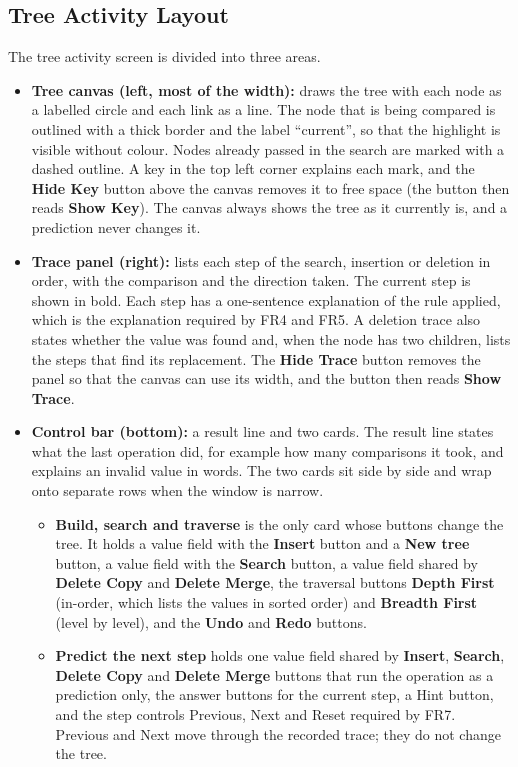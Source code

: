 \subsection{Tree Activity Layout}
The tree activity screen is divided into three areas.

\begin{itemize}
    \item \textbf{Tree canvas (left, most of the width):} draws the tree with each node as a labelled circle and each link as a line. The node that is being compared is outlined with a thick border and the label ``current'', so that the highlight is visible without colour. Nodes already passed in the search are marked with a dashed outline. A key in the top left corner explains each mark, and the \textbf{Hide Key} button above the canvas removes it to free space (the button then reads \textbf{Show Key}). The canvas always shows the tree as it currently is, and a prediction never changes it.
    \item \textbf{Trace panel (right):} lists each step of the search, insertion or deletion in order, with the comparison and the direction taken. The current step is shown in bold. Each step has a one-sentence explanation of the rule applied, which is the explanation required by FR4 and FR5. A deletion trace also states whether the value was found and, when the node has two children, lists the steps that find its replacement. The \textbf{Hide Trace} button removes the panel so that the canvas can use its width, and the button then reads \textbf{Show Trace}.
    \item \textbf{Control bar (bottom):} a result line and two cards. The result line states what the last operation did, for example how many comparisons it took, and explains an invalid value in words. The two cards sit side by side and wrap onto separate rows when the window is narrow.
    \begin{itemize}
        \item \textbf{Build, search and traverse} is the only card whose buttons change the tree. It holds a value field with the \textbf{Insert} button and a \textbf{New tree} button, a value field with the \textbf{Search} button, a value field shared by \textbf{Delete Copy} and \textbf{Delete Merge}, the traversal buttons \textbf{Depth First} (in-order, which lists the values in sorted order) and \textbf{Breadth First} (level by level), and the \textbf{Undo} and \textbf{Redo} buttons.
        \item \textbf{Predict the next step} holds one value field shared by \textbf{Insert}, \textbf{Search}, \textbf{Delete Copy} and \textbf{Delete Merge} buttons that run the operation as a prediction only, the answer buttons for the current step, a Hint button, and the step controls Previous, Next and Reset required by FR7. Previous and Next move through the recorded trace; they do not change the tree.
    \end{itemize}
\end{itemize}

